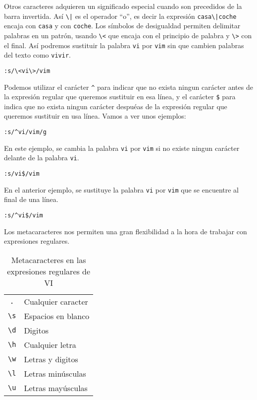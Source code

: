 Otros  caracteres   adquieren  un  significado  especial   cuando  son
precedidos de la barra invertida.  Así \verb.\|. es el operador ``o'',
es decir la  expresión \verb.casa\|coche. encaja con {\tt  casa} y con
{\tt coche}.  Los símbolos de desigualdad  permiten delimitar palabras
en un patrón, usando \verb.\<. que  encaja con el principio de palabra
y \verb.\>. con  el final. Así podremos sustituir la  palabra {\tt vi}
por {\tt vim} sin que cambien palabras del texto como {\tt vivir}.

\begin{verbatim}
:s/\<vi\>/vim
\end{verbatim}

Podemos  utilizar el  carácter  \verb.^. para  indicar  que no  exista
ningun carácter antes  de la expresión regular  que queremos sustituir
en esa línea, y el carácter  \verb.$. para indica que no exista ningun
carácter despuéas  de la expresión  regular que queremos  sustituir en
usa línea. Vamos a ver unos ejemplos:

\begin{verbatim}
:s/^vi/vim/g
\end{verbatim}

En este  ejemplo, se cambia  la palabra {\tt vi}  por {\tt vim}  si no
existe ningun carácter delante de la palabra {\tt vi}.

\begin{verbatim}
:s/vi$/vim
\end{verbatim}

En el anterior ejemplo, se sustituye la palabra {\tt vi} por {\tt vim}
que se encuentre al final de una línea.

\begin{verbatim}
:s/^vi$/vim
\end{verbatim}

Los metacaracteres  nos permiten  una gran flexibilidad  a la  hora de
trabajar con expresiones regulares.

\begin{table}[htbp]
\centering
{}
\begin{tabular}{|c|l|}
\hline
{\tt .}         & Cualquier caracter \\
{\tt \verb.\s.} & Espacios en blanco \\
{\tt \verb.\d.} & Digitos \\
{\tt \verb.\h.} & Cualquier letra \\
{\tt \verb.\w.} & Letras y digitos \\
{\tt \verb.\l.} & Letras minúsculas \\
{\tt \verb.\u.} & Letras mayúsculas \\
\hline
\end{tabular}
\caption{Metacaracteres en las expresiones regulares de VI}
\end{table}

